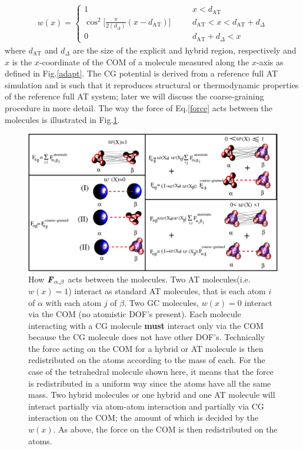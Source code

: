 \documentclass[aps,pre,preprint]{revtex4}
\renewcommand{\v}[1]{\textbf{\textit{#1}}}
\begin{document}
\begin{align}\label{eqn:old-w}
  w(x) =
  \left\{
    \begin{array}{lcl}
      1 &\quad& x < d_{\textrm{AT}}\\
      \cos^2\big[\frac{\pi}{2(d_{{\Delta}})} (x - d_{\textrm{AT}})\big] && d_{\textrm{AT}}  < x < d_{\textrm{AT}} + d_{{\Delta}} \\
      0 && d_{\textrm{AT}} + d_{{\Delta}}  < x
    \end{array}
  \right.
\end{align}
where $d_{\textrm{AT}}$ and $d_{{\Delta}}$ are the size of the
explicit and hybrid region, respectively and $x$ is the $x$-coordinate of the COM of a molecule measured along the $x$-axis as defined in Fig.\ref{adapt}.
The CG potential is derived from a reference full AT simulation and is such that it reproduces structural or thermodynamic properties of the reference full AT system; later we will discuss the coarse-graining procedure in more detail. The way the force of Eq.\ref{force} acts between the molecules is illustrated in Fig.\ref{inter}. 
\begin{figure}
  \centering
  \includegraphics[angle=0,width=17cm]{force.eps}
  \caption{How ${\v F}_{\alpha,\beta}$ acts between the molecules. Two AT molecules(i.e. $w(x)=1$)  interact as standard AT molecules, that is each atom $i$ of $\alpha$ with each atom $j$ of $\beta$. Two GC molecules, $w(x)=0$ interact via the COM (no atomistic DOF's present). Each molecule interacting with a CG molecule {\bf must} interact only via the COM because the CG molecule does not have other DOF's. Technically the force acting on the COM for a hybrid or AT molecule is then redistributed on the atoms according to the mass of each. For the case of the tetrahedral molecule shown here, it means that the force is redistributed in a uniform way since the atoms have all the same mass. Two hybrid molecules or one hybrid and one AT molecule will interact partially via atom-atom interaction and partially via CG interaction on the COM; the amount of which is decided by the $w(x)$. As above, the force on the COM is then redistributed on the atoms.}
  \label{inter}
\end{figure} 
\end{document}
